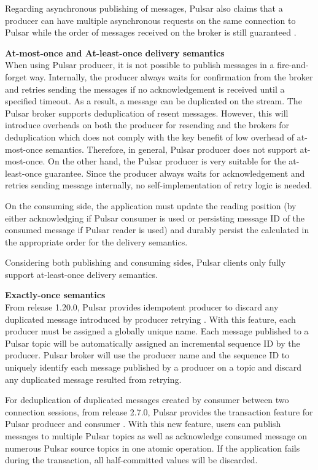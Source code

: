Regarding asynchronous publishing of messages, Pulsar also claims that a producer can have multiple asynchronous requests on the same connection to Pulsar while the order of messages received on the broker is still guaranteed \cite{pulsarinflight}.

\textbf{At-most-once and At-least-once delivery semantics}\\
When using Pulsar producer, it is not possible to publish messages in a fire-and-forget way. Internally, the producer always waits for confirmation from the broker and retries sending the messages if no acknowledgement is received until a specified timeout. As a result, a message can be duplicated on the stream. The Pulsar broker supports deduplication of resent messages. However, this will introduce overheads on both the producer for resending and the brokers for deduplication which does not comply with the key benefit of low overhead of at-most-once semantics. Therefore, in general, Pulsar producer does not support at-most-once. On the other hand, the Pulsar producer is very suitable for the at-least-once guarantee. Since the producer always waits for acknowledgement and retries sending message internally, no self-implementation of retry logic is needed.  

On the consuming side, the application must update the reading position (by either acknowledging if Pulsar consumer is used or persisting message ID of the consumed message if Pulsar reader is used) and durably persist the calculated in the appropriate order for the delivery semantics.

Considering both publishing and consuming sides, Pulsar clients only fully support at-least-once delivery semantics.

\textbf{Exactly-once semantics}\\
From release 1.20.0, Pulsar provides idempotent producer to discard any duplicated message introduced by producer retrying \cite{pulsaridemproducer}. With this feature, each producer must be assigned a globally unique name. Each message published to a Pulsar topic will be automatically assigned an incremental sequence ID by the producer. Pulsar broker will use the producer name and the sequence ID to uniquely identify each message published by a producer on a topic and discard any duplicated message resulted from retrying. 

For deduplication of duplicated messages created by consumer between two connection sessions, from release 2.7.0, Pulsar provides the transaction feature for Pulsar producer and consumer \cite{pulsartransaction}. With this new feature, users can publish messages to multiple Pulsar topics as well as acknowledge consumed message on numerous Pulsar source topics in one atomic operation. If the application fails during the transaction, all half-committed values will be discarded.  

